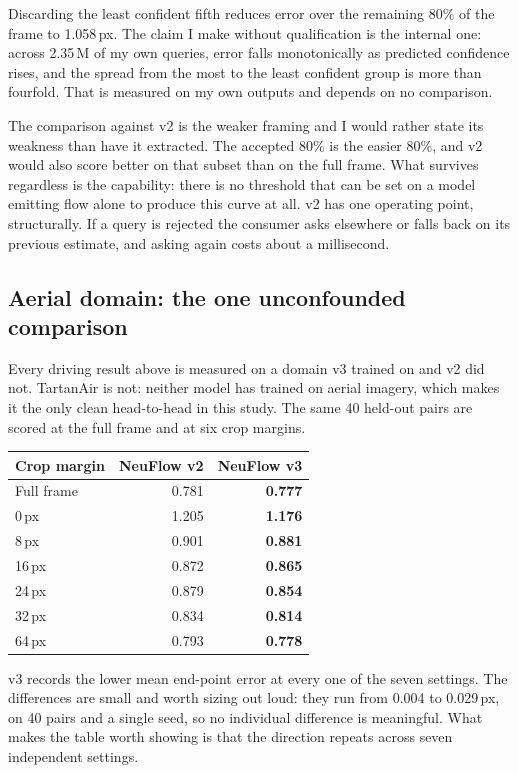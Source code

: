 \documentclass[11pt,a4paper]{article}
\newcommand{\px}{\,px}
\begin{document}
Discarding the least confident fifth reduces error over the remaining 80\% of the
frame to 1.058\px. The claim I make without qualification is the internal one:
across 2.35\,M of my own queries, error falls monotonically as predicted
confidence rises, and the spread from the most to the least confident group is
more than fourfold. That is measured on my own outputs and depends on no
comparison.

The comparison against v2 is the weaker framing and I would rather state its
weakness than have it extracted. The accepted 80\% is the easier 80\%, and v2
would also score better on that subset than on the full frame. What survives
regardless is the capability: there is no threshold that can be set on a model
emitting flow alone to produce this curve at all. v2 has one operating point,
structurally. If a query is rejected the consumer asks elsewhere or falls back on
its previous estimate, and asking again costs about a millisecond.

\subsection{Aerial domain: the one unconfounded comparison}\label{sec:aerial}
Every driving result above is measured on a domain v3 trained on and v2 did not.
TartanAir is not: neither model has trained on aerial imagery, which makes it the
only clean head-to-head in this study. The same 40 held-out pairs are scored at
the full frame and at six crop margins.

\begin{center}
\small
\begin{tabular}{lrr}
\toprule
Crop margin & NeuFlow v2 & NeuFlow v3 \\
\midrule
Full frame & 0.781 & \textbf{0.777} \\
0\,px & 1.205 & \textbf{1.176} \\
8\,px & 0.901 & \textbf{0.881} \\
16\,px & 0.872 & \textbf{0.865} \\
24\,px & 0.879 & \textbf{0.854} \\
32\,px & 0.834 & \textbf{0.814} \\
64\,px & 0.793 & \textbf{0.778} \\
\bottomrule
\end{tabular}
\end{center}

v3 records the lower mean end-point error at every one of the seven settings. The
differences are small and worth sizing out loud: they run from 0.004 to 0.029\px,
on 40 pairs and a single seed, so no individual difference is meaningful. What
makes the table worth showing is that the direction repeats across seven
independent settings.
\end{document}
